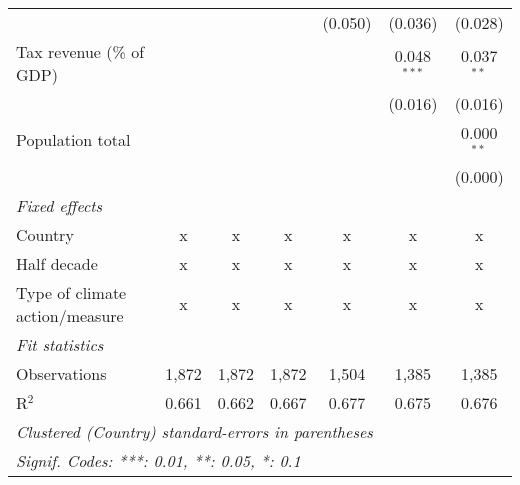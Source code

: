 \begin{tabular}{lcccccc}
                                                         &         &         &                & (0.050)        & (0.036)        & (0.028)\\   
   Tax revenue (\% of GDP)                               &         &         &                &                & 0.048$^{***}$  & 0.037$^{**}$\\   
                                                         &         &         &                &                & (0.016)        & (0.016)\\   
   Population total                                      &         &         &                &                &                & 0.000$^{**}$\\   
                                                         &         &         &                &                &                & (0.000)\\   
   \emph{Fixed effects}\\
   Country                                               & x       & x       & x              & x              & x              & x\\  
   Half decade                                           & x       & x       & x              & x              & x              & x\\  
   Type of climate action/measure                        & x       & x       & x              & x              & x              & x\\  
   \midrule \emph{Fit statistics}\\
   Observations                                          & 1,872   & 1,872   & 1,872          & 1,504          & 1,385          & 1,385\\  
   R$^2$                                                 & 0.661   & 0.662   & 0.667          & 0.677          & 0.675          & 0.676\\  
   \midrule
   \multicolumn{7}{l}{\emph{Clustered (Country) standard-errors in parentheses}}\\
   \multicolumn{7}{l}{\emph{Signif. Codes: ***: 0.01, **: 0.05, *: 0.1}}\\
\end{tabular}
\par\endgroup


